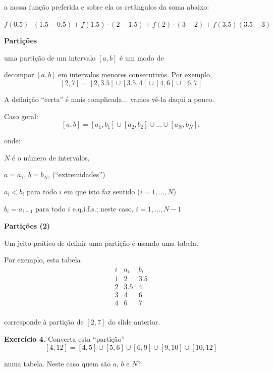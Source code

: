 \documentclass[oneside,12pt]{article}
\begin{document}
a nossa função preferida e sobre ela os retângulos da soma abaixo:

$f(0.5)·(1.5-0.5) + f(1.5)·(2-1.5) + f(2)·(3-2) + f(3.5)(3.5-3)$

\newpage


{\bf Partições}

 uma partição de um intervalo $[a,b]$ é um
modo de

decompor $[a,b]$ em intervalos menores consecutivos. Por exemplo,
%
$$[2,7] = [2,3.5]∪[3.5,4]∪[4,6]∪[6,7]$$

A definição ``certa'' é mais complicada... vamos vê-la daqui a pouco.

Caso geral:
%
$$[a,b] = [a_1,b_1]∪[a_2,b_2]∪\ldots∪[a_N,b_N],$$

onde:

$N$ é o número de intervalos,

$a=a_1$, $b=b_N$, (``extremidades'')

$a_i<b_i$ para todo $i$ em que isto faz sentido ($i=1,\ldots,N$)

$b_i=a_{i+1}$ para todo $i$ e.q.i.f.s.; neste caso, $i=1,\ldots,N-1$

\newpage


{\bf Partições (2)}

Um jeito prático de definir uma partição é usando uma tabela.

Por exemplo, esta tabela
%
$$\begin{array}{ccc}
  i & a_i & b_i \\\hline
  1 & 2 & 3.5 \\
  2 & 3.5 & 4 \\
  3 & 4 & 6 \\
  4 & 6 & 7 \\
  \end{array}
$$

corresponde à partição de $[2,7]$ do slide anterior.

{\bf Exercício 4.} Converta esta ``partição''
%
$$[4,12] = [4,5]∪[5,6]∪[6,9]∪[9,10]∪[10,12]$$

numa tabela. Neste caso quem são $a$, $b$ e $N$?

\newpage

\end{document}
